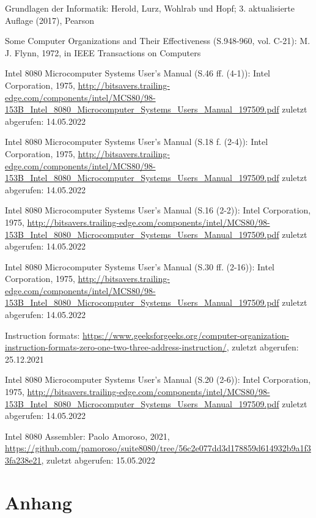 \documentclass[12pt]{article}
\newcounter{applabelno}
\newcommand{\applabel}[1]{\refstepcounter{applabelno}\label{#1}}
\begin{document}
\newpage


\begin{thebibliography}{9}

Grundlagen der Informatik: Herold, Lurz, Wohlrab und Hopf; 3. aktualisierte Auflage (2017), Pearson

Some Computer Organizations and Their Effectiveness (S.948-960, vol. C-21): M. J. Flynn, 1972, in IEEE Transactions on Computers

Intel 8080 Microcomputer Systems User's Manual (S.46 ff. (4-1)): Intel Corporation, 1975, \url{http://bitsavers.trailing-edge.com/components/intel/MCS80/98-153B_Intel_8080_Microcomputer_Systems_Users_Manual_197509.pdf} zuletzt abgerufen: 14.05.2022

Intel 8080 Microcomputer Systems User's Manual (S.18 f. (2-4)): Intel Corporation, 1975, \url{http://bitsavers.trailing-edge.com/components/intel/MCS80/98-153B_Intel_8080_Microcomputer_Systems_Users_Manual_197509.pdf} zuletzt abgerufen: 14.05.2022

Intel 8080 Microcomputer Systems User's Manual (S.16 (2-2)): Intel Corporation, 1975, \url{http://bitsavers.trailing-edge.com/components/intel/MCS80/98-153B_Intel_8080_Microcomputer_Systems_Users_Manual_197509.pdf} zuletzt abgerufen: 14.05.2022

Intel 8080 Microcomputer Systems User's Manual (S.30 ff. (2-16)): Intel Corporation, 1975, \url{http://bitsavers.trailing-edge.com/components/intel/MCS80/98-153B_Intel_8080_Microcomputer_Systems_Users_Manual_197509.pdf} zuletzt abgerufen: 14.05.2022

Instruction formats: \url{https://www.geeksforgeeks.org/computer-organization-instruction-formats-zero-one-two-three-address-instruction/}, zuletzt abgerufen: 25.12.2021

Intel 8080 Microcomputer Systems User's Manual (S.20 (2-6)): Intel Corporation, 1975, \url{http://bitsavers.trailing-edge.com/components/intel/MCS80/98-153B_Intel_8080_Microcomputer_Systems_Users_Manual_197509.pdf} zuletzt abgerufen: 14.05.2022

Intel 8080 Assembler: Paolo Amoroso, 2021, \url{https://github.com/pamoroso/suite8080/tree/56c2e077dd3d178859d614932b9a1f33fa238e21}, zuletzt abgerufen: 15.05.2022

\end{thebibliography}

\newpage
\thispagestyle{empty}


\appendix
\section*{Anhang}

\applabel{anhang:instr_state}

\end{document}
